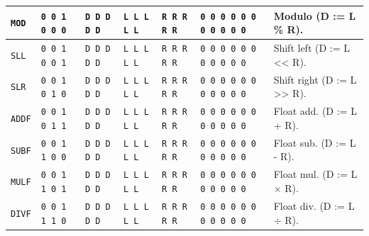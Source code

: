 \documentclass{report}
\begin{document}
{\begin{center}
\begin{tabular}[ht]{
	| p{} | p{} | p{} | p{}
	| p{} | p{} | p{} |
}
	\texttt{MOD} & \texttt{0 0 1 0 0 0} & \texttt{D D D D D} & \texttt{L L L L L} & \texttt{R R R R R} &
		\texttt{0 0 0 0 0 0 0 0 0 0 0} & Modulo (D := L \% R). \\
	\hline
	
	\texttt{SLL} & \texttt{0 0 1 0 0 1} & \texttt{D D D D D} & \texttt{L L L L L} & \texttt{R R R R R} &
		\texttt{0 0 0 0 0 0 0 0 0 0 0} & Shift left (D := L << R). \\
	\hline
	
	\texttt{SLR} & \texttt{0 0 1 0 1 0} & \texttt{D D D D D} & \texttt{L L L L L} & \texttt{R R R R R} &
		\texttt{0 0 0 0 0 0 0 0 0 0 0} & Shift right (D := L >> R). \\
	\hline
	
	\texttt{ADDF} & \texttt{0 0 1 0 1 1} & \texttt{D D D D D} & \texttt{L L L L L} & \texttt{R R R R R} &
		\texttt{0 0 0 0 0 0 0 0 0 0 0} & Float add. (D := L + R). \\
	\hline
	
	\texttt{SUBF} & \texttt{0 0 1 1 0 0} & \texttt{D D D D D} & \texttt{L L L L L} & \texttt{R R R R R} &
		\texttt{0 0 0 0 0 0 0 0 0 0 0} & Float sub. (D := L - R). \\
	\hline
	
	\texttt{MULF} & \texttt{0 0 1 1 0 1} & \texttt{D D D D D} & \texttt{L L L L L} & \texttt{R R R R R} &
		\texttt{0 0 0 0 0 0 0 0 0 0 0} & Float mul. (D := L $\times$ R). \\
	\hline
	
	\texttt{DIVF} & \texttt{0 0 1 1 1 0} & \texttt{D D D D D} & \texttt{L L L L L} & \texttt{R R R R R} &
		\texttt{0 0 0 0 0 0 0 0 0 0 0} & Float div. (D := L $\div$ R). \\
	\hline
\end{tabular}
\end{center}
}
\end{document}
